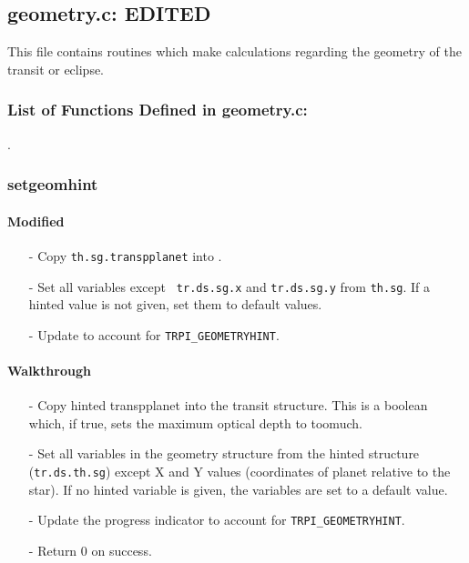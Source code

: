 \documentclass[letterpaper,12pt]{article}
\begin{document}
\newpage
\subsection{geometry.c: EDITED}
This file contains routines which make calculations regarding the geometry of the transit or eclipse.
\subsubsection{List of Functions Defined in geometry.c:}
 \newline

. \newline

 \newline

\subsubsection{setgeomhint}
\paragraph{Modified}
\begin{enumerate}[leftmargin=10pt, noitemsep, parsep=0pt, topsep=0ex]
\item[-] Copy {\tt th.sg.transpplanet} into .
\item[-] Set all  variables except {\tt
    tr.ds.sg.x} and {\tt tr.ds.sg.y} from {\tt th.sg}. If a hinted value is not given, set them to default values.
\item[-] Update  to account for {\tt TRPI\_GEOMETRYHINT}.
\end{enumerate}

\paragraph{Walkthrough}
\begin{enumerate}[leftmargin=10pt, noitemsep, parsep=0pt, topsep=0ex]
\item[-] Copy hinted transpplanet into the transit structure. This is a boolean which, if true, sets the maximum optical depth to toomuch.
\item[-] Set all variables in the geometry structure from the hinted structure ({\tt tr.ds.th.sg}) except X and Y values (coordinates of planet relative to the star). If no hinted variable is given, the variables are set to a default value.
\item[-] Update the progress indicator to account for {\tt TRPI\_GEOMETRYHINT}.
\item[-] Return 0 on success.
\end{enumerate}
\end{document}
